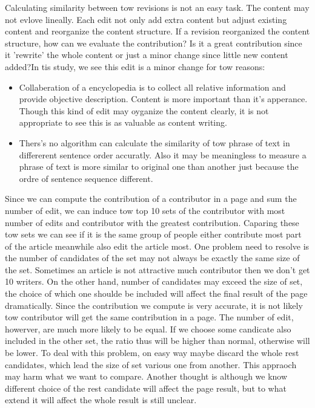 \documentclass{elsarticle}
\begin{document}
Calculating similarity between tow revisions is not an easy task. The
content may not evlove lineally. Each edit not only add extra content
but adjust existing content and reorganize the content
structure. If a revision reorganized the content structure, how can we
evaluate  the contribution? Is it a great contribution since it
'rewrite' the whole content or just a minor change since little new
content added?In tis study, we see this edit is a minor change for tow
reasons:
\begin{itemize}
\item Collaberation of a encyclopedia is to collect all relative
  information and provide objective description. Content is more
  important than it's apperance. Though this kind of edit may oyganize
  the content clearly, it is not appropriate to see this is as
  valuable as content writing.
\item Thers's no algorithm can calculate the similarity of tow phrase
  of text in differerent sentence order accuratly. Also it may be
  meaningless to measure a phrase of text is more similar to original
  one than another just because the ordre of sentence sequence different. 
\end{itemize}

Since we can compute the contribution of a contributor in a page and
sum the number of edit, we can induce tow top 10 sets of
the contributor with most number of edits and contributor with the
greatest contribution. Caparing these tow sets we can see if it is the
same group of people either contribute most part of the article
meanwhile also edit the article most.   One problem need to resolve is
the number of candidates of  the set may not always    be exactly
the same size of the
set. Sometimes an article is not attractive much contributor then we
don't get 10 writers. On the other hand, number of candidates may
exceed the size of set, the choice of which one shoulde be included
will affect the final result of the page dramatically. Since the
contribution we compute is very accurate, it is not likely tow
contributor will get the same contribution in a page. The number of
edit, howerver, are much more likely to be equal. If we choose some
candicate also included in the other set, the ratio thus will be
higher than normal, otherwise will be lower. To deal with this
problem, on easy way maybe discard  the whole rest candidates, which
lead the size of set various one from another. This appraoch may harm
what we want to compare. Another thought is although we know different
choice of the rest candidate will affect the  page result, but to what
extend it will affect the whole result is still unclear. 
\end{document}
